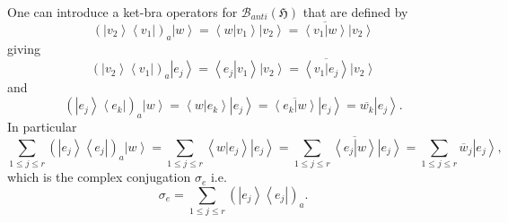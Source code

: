 \documentclass[aps,preprint]{revtex4}
\begin{document}
One can introduce a ket-bra operators for $\mathcal{B}_{anti}\left( 
\mathfrak{H}\right) $ that are defined by 
\begin{equation}
\left( \left\vert v_{2}\right\rangle \left\langle v_{1}\right\vert \right)
_{a}\left\vert w\right\rangle =\left\langle \left. w\right\vert
v_{1}\right\rangle \left\vert v_{2}\right\rangle =\overline{\left\langle
\left. v_{1}\right\vert w\right\rangle }\left\vert v_{2}\right\rangle
\end{equation}
giving 
\begin{equation}
\left( \left\vert v_{2}\right\rangle \left\langle v_{1}\right\vert \right)
_{a}\left\vert e_{j}\right\rangle =\left\langle \left. e_{j}\right\vert
v_{1}\right\rangle \left\vert v_{2}\right\rangle =\overline{\left\langle
\left. v_{1}\right\vert e_{j}\right\rangle }\left\vert v_{2}\right\rangle
\end{equation}
and 
\begin{equation}
\left( \left\vert e_{j}\right\rangle \left\langle e_{k}\right\vert \right)
_{a}\left\vert w\right\rangle =\left\langle \left. w\right\vert
e_{k}\right\rangle \left\vert e_{j}\right\rangle =\overline{\left\langle
\left. e_{k}\right\vert w\right\rangle }\left\vert e_{j}\right\rangle =%
\overline{w_{k}}\left\vert e_{j}\right\rangle .
\end{equation}
In particular 
\begin{equation}
\sum_{1\leq j\leq r}\left( \left\vert e_{j}\right\rangle \left\langle
e_{j}\right\vert \right) _{a}\left\vert w\right\rangle =\sum_{1\leq j\leq
r}\left\langle \left. w\right\vert e_{j}\right\rangle \left\vert
e_{j}\right\rangle =\sum_{1\leq j\leq r}\overline{\left\langle \left.
e_{j}\right\vert w\right\rangle }\left\vert e_{j}\right\rangle =\sum_{1\leq
j\leq r}\overline{w}_{j}\left\vert e_{j}\right\rangle ,
\end{equation}
which is the complex conjugation $\sigma_{e}$ i.e. 
\begin{equation}
\sigma_{e}=\sum_{1\leq j\leq r}\left( \left\vert e_{j}\right\rangle
\left\langle e_{j}\right\vert \right) _{a}.
\end{equation}
\end{document}
